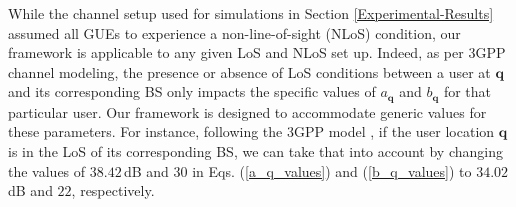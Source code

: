 While the channel setup used for simulations in Section \ref{Experimental-Results} assumed all GUEs to experience a non-line-of-sight (NLoS) condition, our framework is applicable to any given LoS and NLoS set up. Indeed, as per 3GPP channel modeling, the presence or absence of LoS conditions between a user at $\bm{q}$ and its corresponding BS only impacts the specific values of $a_{\bm{q}}$ and $b_{\bm{q}}$ for that particular user. Our framework is designed to accommodate generic values for these parameters. 
For instance, following the 3GPP model \cite{3GPP38901}, if the user location $\bm{q}$ is in the LoS of its corresponding BS, we can take that into account by changing the values of $38.42$\,dB and $30$ in Eqs. (\ref{a_q_values}) and (\ref{b_q_values}) to $34.02$\,dB and $22$, respectively.

